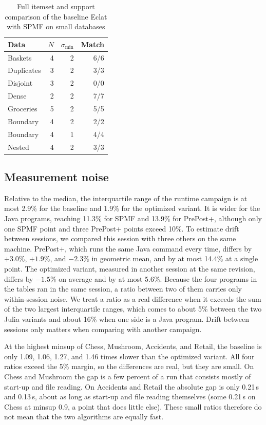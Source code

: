 \begin{table}[t]
\centering
\caption{Full itemset and support comparison of the baseline Eclat with SPMF on small
databases}
\label{tab:toy-spmf}
\begin{tabular}{lrrr}
\hline
Data & $N$ & $\sigma_{\min}$ & Match \\
\hline
Baskets & 4 & 2 & 6/6 \\
Duplicates & 3 & 2 & 3/3 \\
Disjoint & 3 & 2 & 0/0 \\
Dense & 2 & 2 & 7/7 \\
Groceries & 5 & 2 & 5/5 \\
Boundary & 4 & 2 & 2/2 \\
Boundary & 4 & 1 & 4/4 \\
Nested & 4 & 2 & 3/3 \\
\hline
\end{tabular}
\end{table}

\subsection{Measurement noise}
\label{app:noise}
Relative to the median, the interquartile range of the runtime campaign is at most 2.9\%
for the baseline and 1.9\% for the optimized variant. It is wider for the Java programs,
reaching 11.3\% for SPMF and 13.9\% for PrePost+, although only one SPMF point and three
PrePost+ points exceed 10\%. To estimate drift between sessions, we compared this session
with three others on the same machine. PrePost+, which runs the same Java command every
time, differs by $+3.0\%$, $+1.9\%$, and $-2.3\%$ in geometric mean, and by at most
14.4\% at a single point. The optimized variant, measured in another session at the same
revision, differs by $-1.5\%$ on average and by at most 5.6\%. Because the four programs
in the tables ran in the same session, a ratio between two of them carries only
within-session noise. We treat a ratio as a real difference when it exceeds the sum of
the two largest interquartile ranges, which comes to about 5\% between the two Julia
variants and about 16\% when one side is a Java program. Drift between sessions only
matters when comparing with another campaign.

At the highest minsup of Chess, Mushroom, Accidents, and Retail, the baseline is only
1.09, 1.06, 1.27, and 1.46 times slower than the optimized variant. All four ratios
exceed the 5\% margin, so the differences are real, but they are small. On Chess and
Mushroom the gap is a few percent of a run that consists mostly of start-up and file
reading. On Accidents and Retail the absolute gap is only 0.21\,s and 0.13\,s, about as
long as start-up and file reading themselves (some 0.21\,s on Chess at minsup 0.9, a
point that does little else). These small ratios therefore do not mean that the two
algorithms are equally fast.

